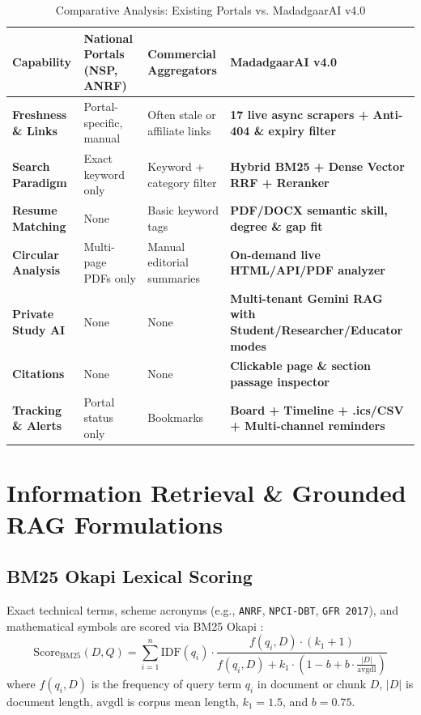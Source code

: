 \documentclass[12pt,a4paper,oneside]{report}
\begin{document}
\begin{table}[htbp]
    \centering
    \caption{Comparative Analysis: Existing Portals vs. MadadgaarAI v4.0}
    \label{tab:comparison}
    \footnotesize
    \begin{tabularx}{\textwidth}{>{\bfseries}lXXX}
        \toprule
        Capability & National Portals (NSP, ANRF) & Commercial Aggregators & MadadgaarAI v4.0 \\
        \midrule
        Freshness \& Links & Portal-specific, manual & Often stale or affiliate links & \textbf{17 live async scrapers + Anti-404 \& expiry filter} \\
        Search Paradigm & Exact keyword only & Keyword + category filter & \textbf{Hybrid BM25 + Dense Vector RRF + Reranker} \\
        Resume Matching & None & Basic keyword tags & \textbf{PDF/DOCX semantic skill, degree \& gap fit} \\
        Circular Analysis & Multi-page PDFs only & Manual editorial summaries & \textbf{On-demand live HTML/API/PDF analyzer} \\
        Private Study AI & None & None & \textbf{Multi-tenant Gemini RAG with Student/Researcher/Educator modes} \\
        Citations & None & None & \textbf{Clickable page \& section passage inspector} \\
        Tracking \& Alerts & Portal status only & Bookmarks & \textbf{Board + Timeline + .ics/CSV + Multi-channel reminders} \\
        \bottomrule
    \end{tabularx}
\end{table}

\section{Information Retrieval \& Grounded RAG Formulations}

\subsection{BM25 Okapi Lexical Scoring}
Exact technical terms, scheme acronyms (e.g., \texttt{ANRF}, \texttt{NPCI-DBT}, \texttt{GFR 2017}), and mathematical symbols are scored via BM25 Okapi \cite{robertson2009bm25}:
\begin{equation}
    \text{Score}_{\text{BM25}}(D, Q) = \sum_{i=1}^{n} \text{IDF}(q_i) \cdot \frac{f(q_i, D) \cdot (k_1 + 1)}{f(q_i, D) + k_1 \cdot \left(1 - b + b \cdot \frac{|D|}{\text{avgdl}}\right)}
\end{equation}
where $f(q_i, D)$ is the frequency of query term $q_i$ in document or chunk $D$, $|D|$ is document length, $\text{avgdl}$ is corpus mean length, $k_1 = 1.5$, and $b = 0.75$.
\end{document}
